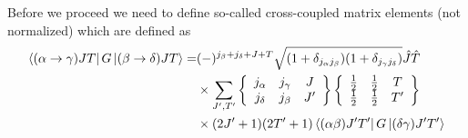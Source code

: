 Before we proceed we need to define so-called 
cross-coupled matrix elements (not normalized) which 
are defined as\newline
\begin{eqnarray}
\left\langle (\alpha\rightarrow \gamma)JT \right|G
\left| (\beta\rightarrow \delta)JT \right\rangle=&(-)^{j_{\beta}+j_{\delta}+J+T}
\sqrt{(1+\delta_{j_{\alpha}j_{\beta}})(1+\delta_{j_{\gamma}j_{\delta}})}
\hat{J}\hat{T}\nonumber\\&
\times
{\displaystyle \sum_{J',T'}}
\left\{
\begin{array}{ccc}
       j_{\alpha}&j_{\gamma}&J\\j_{\delta}&j_{\beta}&J'
\end{array}
\right\}
\left\{
\begin{array}{ccc}
       \frac{1}{2}&\frac{1}{2}&T\\ \frac{1}{2}&\frac{1}{2}&T'
\end{array}
\right\}\nonumber\\& \times
(2J'+1)(2T'+1)
\left\langle (\alpha\beta)J'T' \right|G\left| (\delta\gamma)J'T' \right\rangle
\label{eq:cross}
\end{eqnarray}


